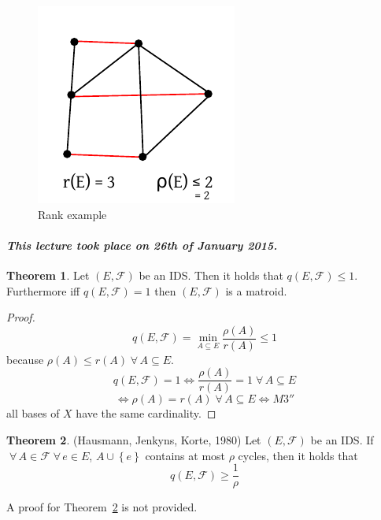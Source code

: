 \documentclass[a4paper]{article}
\theoremstyle{definition}
\newtheorem{theorem}{Theorem}
\newcommand{\set}[1]{\left\{#1\right\}}
\newcommand{\dateref}[1]{\paragraph{\textit{This lecture took place on #1.}}}
\newcommand{\fall}{\;\forall\,}
\newcommand{\noproof}[1]{A proof for Theorem~\ref{#1} is not provided.}
\begin{document}
  \begin{figure}[!ht]
    \begin{center}
      \includegraphics{img/rank_example.pdf}
      \caption{Rank example}
    \end{center}
  \end{figure}

\dateref{26th of January 2015}

\begin{theorem}
  \label{proposition-8.3}
  Let $(E, \mathcal{F})$ be an IDS. Then it holds that $q(E, \mathcal{F}) \leq 1$.
  Furthermore iff $q(E, \mathcal{F}) = 1$ then $(E, \mathcal{F})$ is a matroid.
\end{theorem}

\begin{proof}
  \[ q(E, \mathcal{F}) = \min_{A \subseteq E} \frac{\rho(A)}{r(A)} \leq 1 \]
  because $\rho(A) \leq r(A) \fall A \subseteq E$.
  \[ q(E, \mathcal{F}) = 1 \Leftrightarrow \frac{\rho(A)}{r(A)} = 1 \fall A \subseteq E \]
  \[ \Leftrightarrow \rho(A) = r(A) \fall A \subseteq E \Leftrightarrow M3'' \]
  all bases of $X$ have the same cardinality.
\end{proof}

\begin{theorem}
  \label{satz-8.4}
  (Hausmann, Jenkyns, Korte, 1980)
  Let $(E, \mathcal{F})$ be an IDS. If $\fall A \in \mathcal{F} \fall e \in E$,
  $A \cup \set{e}$ contains at most $\rho$ cycles, then it holds that
  \[ q(E, \mathcal{F}) \geq \frac{1}{\rho} \]
\end{theorem}

\noproof{satz-8.4}
\end{document}
